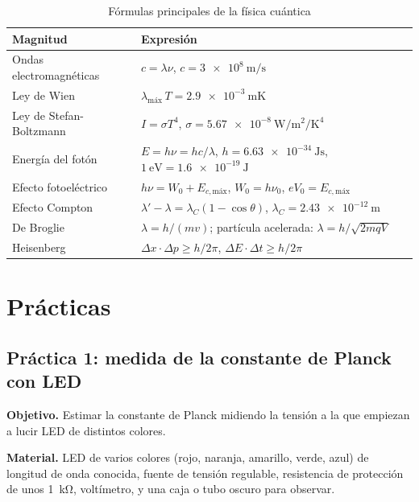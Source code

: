 \begin{table}[H]
    \centering
    \caption{Fórmulas principales de la física cuántica}
    \vspace{-5pt}
    \begin{tabular}{@{}lL{10cm}@{}}
        \toprule
        \textbf{Magnitud} & \textbf{Expresión} \\
        \midrule
        Ondas electromagnéticas & \(c = \lambda\nu\), \quad \(c = \qty{3e8}{\m\per\second}\) \\[3pt]
        Ley de Wien & \(\lambda_{\text{máx}}\,T = \qty{2.9e-3}{\m\kelvin}\) \\[3pt]
        Ley de Stefan-Boltzmann & \(I = \sigma T^4\), \quad \(\sigma = \qty{5.67e-8}{\watt\per\m\squared\per\kelvin\tothe{4}}\) \\[3pt]
        Energía del fotón & \(E = h\nu = hc/\lambda\), \quad \(h = \qty{6.63e-34}{\joule\second}\), \quad \(\qty{1}{\electronvolt} = \qty{1.6e-19}{\joule}\) \\[3pt]
        Efecto fotoeléctrico & \(h\nu = W_0 + E_{c,\text{máx}}\), \quad \(W_0 = h\nu_0\), \quad \(eV_0 = E_{c,\text{máx}}\) \\[3pt]
        Efecto Compton & \(\lambda' - \lambda = \lambda_C(1 - \cos\theta)\), \quad \(\lambda_C = \qty{2.43e-12}{\m}\) \\[3pt]
        De Broglie & \(\lambda = h/(mv)\); \quad partícula acelerada: \(\lambda = h/\sqrt{2mqV}\) \\[3pt]
        Heisenberg & \(\Delta x\cdot\Delta p \geq h/2\pi\), \quad \(\Delta E\cdot\Delta t \geq h/2\pi\) \\
        \bottomrule
    \end{tabular}
    \label{tab:cua-resumen}
\end{table}

\section{Prácticas}\label{sec:cua-practicas}

\subsection{Práctica 1: medida de la constante de Planck con LED}\label{subsec:cua-practica-led}

\textbf{Objetivo.} Estimar la constante de Planck midiendo la tensión a la que empiezan a lucir LED de distintos colores.

\textbf{Material.} LED de varios colores (rojo, naranja, amarillo, verde, azul) de longitud de onda conocida, fuente de tensión
regulable, resistencia de protección de unos \qty{1}{\kilo\ohm}, voltímetro, y una caja o tubo oscuro para observar.

